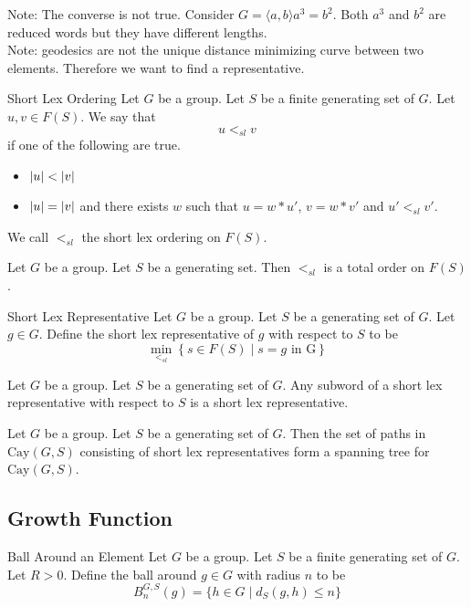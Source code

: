 \documentclass[a4paper]{article}
\begin{document}
Note: The converse is not true. Consider $G=\langle a,b\rangle a^3=b^2$. Both $a^3$ and $b^2$ are reduced words but they have different lengths. \\

Note: geodesics are not the unique distance minimizing curve between two elements. Therefore we want to find a representative. 

\begin{defn}{Short Lex Ordering}{} Let $G$ be a group. Let $S$ be a finite generating set of $G$. Let $u,v\in F(S)$. We say that $$u<_{sl}v$$ if one of the following are true. 
\begin{itemize}
\item $\abs{u}<\abs{v}$
\item $\abs{u}=\abs{v}$ and there exists $w$ such that $u=w\ast u'$, $v=w\ast v'$ and $u'<_{sl}v'$. 
\end{itemize}
We call $<_{sl}$ the short lex ordering on $F(S)$. 
\end{defn}

\begin{lmm}{}{} Let $G$ be a group. Let $S$ be a generating set. Then $<_{sl}$ is a total order on $F(S)$. 
\end{lmm}

\begin{defn}{Short Lex Representative}{} Let $G$ be a group. Let $S$ be a generating set of $G$. Let $g\in G$. Define the short lex representative of $g$ with respect to $S$ to be $$\min_{<_{sl}}\left\{s\in F(S)\;|\;s=g\text{ in G}\right\}$$
\end{defn}

\begin{lmm}{}{} Let $G$ be a group. Let $S$ be a generating set of $G$. Any subword of a short lex representative with respect to $S$ is a short lex representative. 
\end{lmm}

\begin{crl}{}{} Let $G$ be a group. Let $S$ be a generating set of $G$. Then the set of paths in $\text{Cay}(G,S)$ consisting of short lex representatives form a spanning tree for $\text{Cay}(G,S)$. 
\end{crl}

\subsection{Growth Function}
\begin{defn}{Ball Around an Element}{} Let $G$ be a group. Let $S$ be a finite generating set of $G$. Let $R>0$. Define the ball around $g\in G$ with radius $n$ to be $$B_n^{G,S}(g)=\{h\in G\;|\;d_S(g,h)\leq n\}$$
\end{defn}
\end{document}
